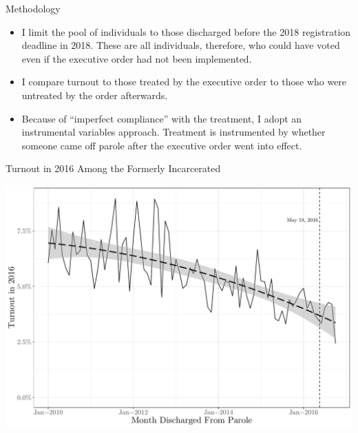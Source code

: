 \documentclass[
  ignorenonframetext,
]{beamer}
\providecommand{\tightlist}{%
  \setlength{\itemsep}{0pt}\setlength{\parskip}{0pt}}
\begin{document}
\begin{frame}{Methodology}
\protect\hypertarget{methodology}{}
\begin{itemize}[<+->]
\tightlist
\item
  I limit the pool of individuals to those discharged before the 2018
  registration deadline in 2018. These are all individuals, therefore,
  who could have voted even if the executive order had not been
  implemented.
\end{itemize}

\begin{itemize}[<+->]
\tightlist
\item
  I compare turnout to those treated by the executive order to those who
  were untreated by the order afterwards.
\end{itemize}

\begin{itemize}[<+->]
\tightlist
\item
  Because of ``imperfect compliance'' with the treatment, I adopt an
  instrumental variables approach. Treatment is instrumented by whether
  someone came off parole after the executive order went into effect.
\end{itemize}
\end{frame}

\begin{frame}{Turnout in 2016 Among the Formerly Incarcerated}
\protect\hypertarget{turnout-in-2016-among-the-formerly-incarcerated}{}
\begin{center}\includegraphics[width=0.85\linewidth,height=0.85\textheight]{mpsa_files/figure-beamer/unnamed-chunk-1-1} \end{center}
\end{frame}
\end{document}
